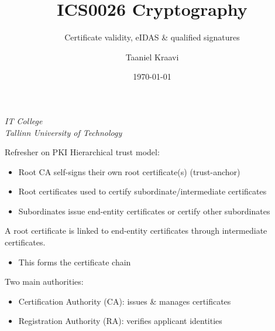 \usepackage{tikz}

\newlength{\offset}

\title{ICS0026 Cryptography}
\subtitle{Certificate validity, eIDAS \& qualified signatures}
\date{\today}
\author{Taaniel Kraavi}
\institute%
{%
  \textit{IT College}\\
  \textit{Tallinn University of Technology}
}


\begin{frame}
  \titlepage
\end{frame}

\begin{frame}{Refresher on PKI}
  Hierarchical trust model:
  \begin{itemize}[<+(1)->]
    \item Root CA self-signs their own root certificate(s) (trust-anchor)
    \item Root certificates used to certify subordinate/intermediate certificates
    \item Subordinates issue end-entity certificates or certify other subordinates
  \end{itemize}

  \vspace*{1em}

  \pause
  A root certificate is linked to end-entity certificates through intermediate certificates.
  \begin{itemize}[<+(1)->]
    \item This forms the certificate chain
  \end{itemize}

  \vspace*{1em}

  \pause
  Two main authorities:
  \begin{itemize}[<+(1)->]
    \item Certification Authority (CA): issues \& manages certificates
    \item Registration Authority (RA): verifies applicant identities
  \end{itemize}
\end{frame}

